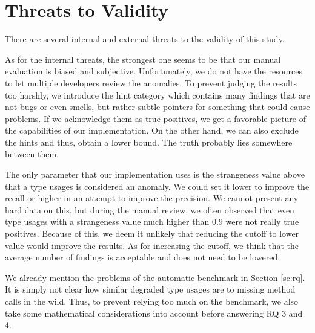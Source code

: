 \section{Threats to Validity}

There are several internal and external threats to the validity of this study.

As for the internal threats, the strongest one seems to be that our manual evaluation is biased and subjective.
Unfortunately, we do not have the resources to let multiple developers review the anomalies.
To prevent judging the results too harshly, we introduce the hint category which contains many findings that are not bugs or even smells, but rather subtle pointers for something that could cause problems.
If we acknowledge them as true positives, we get a favorable picture of the capabilities of our implementation.
On the other hand, we can also exclude the hints and thus, obtain a lower bound.
The truth probably lies somewhere between them.

The only parameter that our implementation uses is the strangeness value above that a type usages is considered an anomaly.
We could set it lower to improve the recall or higher in an attempt to improve the precision.
We cannot present any hard data on this, but during the manual review, we often observed that even type usages with a strangeness value much higher than $0.9$ were not really true positives.
Because of this, we deem it unlikely that reducing the cutoff to lower value would improve the results.
As for increasing the cutoff, we think that the average number of findings is acceptable and does not need to be lowered.

We already mention the problems of the automatic benchmark in Section \ref{sc:rq}.
It is simply not clear how similar degraded type usages are to missing method calls in the wild.
Thus, to prevent relying too much on the benchmark, we also take some mathematical considerations into account before answering RQ 3 and 4.

